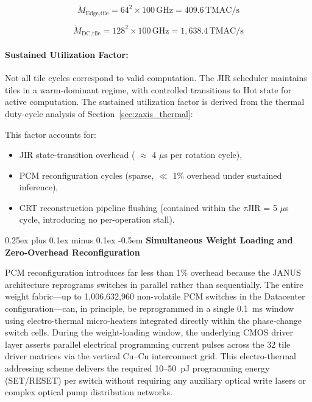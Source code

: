 \documentclass[journal]{IEEEtran}
\makeatletter
\newcommand{\subparagraph}{\@startsection{subparagraph}{5}{\parindent}%
  {0.25ex plus 0.1ex minus 0.1ex}%
  {-0.5em}%
  {\normalfont\normalsize\itshape}} %
\makeatother
\begin{document}
\begin{equation}
\dot{M}_{\text{Edge,tile}} = 64^2 \times 100\,\text{GHz} = 409.6\,\text{TMAC/s}
\end{equation}

\begin{equation}
\dot{M}_{\text{DC,tile}} = 128^2 \times 100\,\text{GHz} = 1,638.4\,\text{TMAC/s}
\end{equation}

\paragraph{\textbf{Sustained Utilization Factor:}}

Not all tile cycles correspond to valid computation. The JIR scheduler maintains tiles in a warm-dominant regime, with controlled transitions to Hot state for active computation. The sustained utilization factor is derived from the thermal duty-cycle analysis of Section~\ref{sec:zaxis_thermal}:

\begin{center}
\end{center}

This factor accounts for:

\begin{itemize}
\item JIR state-transition overhead ( $\approx$ 4 $\mu$s per rotation cycle),
\item PCM reconfiguration cycles (sparse, $\ll$ 1\% overhead under sustained inference),
\item  CRT reconstruction pipeline flushing (contained within the $\tau$JIR = 5 $\mu$s cycle, introducing no per-operation stall).
\end{itemize}

\subparagraph{\textbf{Simultaneous Weight Loading and Zero-Overhead Reconfiguration}}

PCM reconfiguration introduces far less than 1\% overhead because the JANUS architecture reprograms switches in parallel rather than sequentially. The entire weight fabric---up to 1,006,632,960 non-volatile PCM switches in the Datacenter configuration---can, in principle, be reprogrammed in a single 0.1~ms window using electro-thermal micro-heaters integrated directly within the phase-change switch cells. During the weight-loading window, the underlying CMOS driver layer asserts parallel electrical programming current pulses across the 32 tile driver matrices via the vertical Cu--Cu interconnect grid. This electro-thermal addressing scheme delivers the required 10--50~pJ programming energy (SET/RESET) per switch without requiring any auxiliary optical write lasers or complex optical pump distribution networks.
\end{document}
